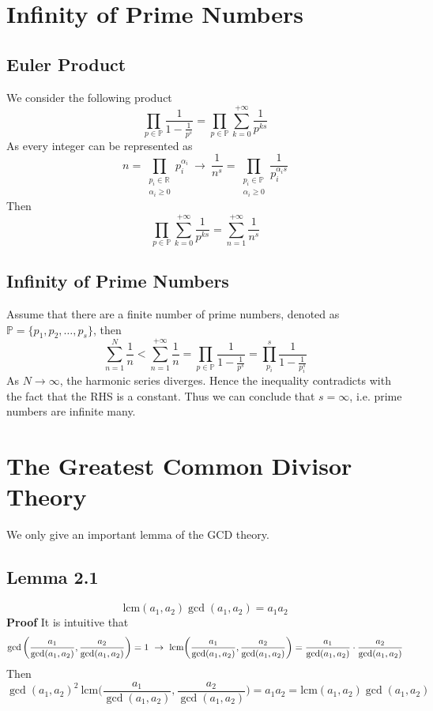 \documentclass[11pt]{article}
\begin{document}
\section{Infinity of Prime Numbers}
\subsection{Euler Product}
We consider the following product
\begin{equation}
    \prod_{p \in \mathbb{P}} \frac{1}{1-\frac{1}{p^s}} = \prod_{p \in \mathbb{P}} \sum_{k=0}^{+\infty} \frac{1}{p^{ks}}
\end{equation}
As every integer can be represented as
\begin{equation}
    n = \prod_{\substack{p_i \in \mathbb{R} \\ \alpha_i \geq 0}} p_i^{\alpha_i}~\longrightarrow~\frac{1}{n^s} = \prod_{\substack{p_i \in \mathbb{P} \\ \alpha_i \geq 0}} \frac{1}{p_i^{\alpha_is}}
\end{equation}
Then 
\begin{equation}
    \prod_{p \in \mathbb{P}} \sum_{k=0}^{+\infty} \frac{1}{p^{ks}} = \sum_{n=1}^{+\infty}\frac{1}{n^s}
\end{equation}
\subsection{Infinity of Prime Numbers}
Assume that there are a finite number of prime numbers, denoted as $\mathbb{P} = \{p_1, p_2, \dots, p_s \}$, then
\begin{equation}
    \sum_{n=1}^{N} \frac{1}{n} < \sum_{n=1}^{+\infty} \frac{1}{n} = \prod_{p \in 
    \mathbb{P}} \frac{1}{1-\frac{1}{p^s}} = \prod_{p_i}^{s} \frac{1}{1-\frac{1}{p_i^s}}
\end{equation} 
As $N \rightarrow \infty$, the harmonic series diverges. Hence the inequality contradicts with the 
fact that the RHS is a constant. Thus we can conclude that $s = \infty$, i.e. prime numbers are infinite many.
\section{The Greatest Common Divisor Theory}
We only give an important lemma of the GCD theory.
\subsection{Lemma 2.1}
\begin{equation}
    \text{lcm}(a_1,a_2)\gcd(a_1,a_2) = a_1a_2
\end{equation}
\textbf{Proof} It is intuitive that
\begin{equation}
    \gcd\bigg( \frac{a_1}{\text{gcd}(a_1,a_2)},\frac{a_2}{\text{gcd}(a_1,a_2)}\bigg) = 1~\rightarrow~\text{lcm}\bigg(\frac{a_1}{\gcd(a_1,a_2)}, \frac{a_2}{\gcd(a_1,a_2)}\bigg) = \frac{a_1}{\gcd(a_1,a_2)} \cdot \frac{a_2}{\gcd(a_1,a_2)} \notag
\end{equation}
Then
\begin{equation}
    \gcd(a_1,a_2)^2~\text{lcm}\bigg(\frac{a_1}{\gcd(a_1,a_2)}, \frac{a_2}{\gcd(a_1,a_2)}\bigg) = a_1a_2 = \text{lcm}(a_1,a_2)\gcd(a_1,a_2)
\end{equation}
\end{document}
